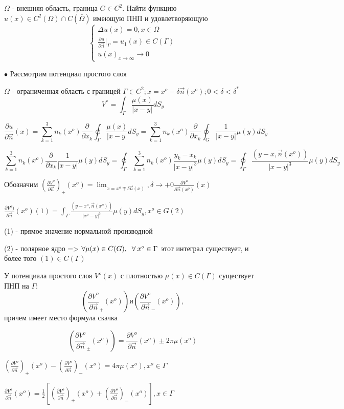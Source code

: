 \begin{theorem}
$\Omega$ - внешняя область, граница $G \in C^2$. Найти функцию $u(x) \in C^2(\Omega) \cap C(\bar{\Omega})$ имеющую ПНП и удовлетворяющую 
\begin{equation}
\begin{cases}
\Delta u(x) = 0, x \in \Omega
\\
\frac{\partial u}{\partial \vec{n}}|_{\Gamma} = u_1(x) \in C(\Gamma)
\\
u(x)_{x \to \infty} \to 0
\end{cases}
\end{equation}
\end{theorem}
$\bullet$ Рассмотрим потенциал простого слоя

$\Omega$ - ограниченная область с границей $\Gamma \in C^2; x = x^o - \delta \vec{n}(x^o); 0 < \delta < \delta^*$
  $$V^* = \int_{\Gamma} \frac{\mu(x)}{|x - y|}dS_y$$

$$\frac{\partial u}{\partial \vec{n}}(x) = \sum_{k = 1}^3 n_k(x^o) \frac{\partial}{\partial x_k}\oint_{\Gamma} \frac{\mu(x)}{|x - y|}dS_y = \sum_{k = 1}^3 n_k(x^o) \frac{\partial}{\partial x_k}\oint_G \frac{1}{|x - y|}\mu(y)dS_y$$

$$\sum_{k = 1}^3 n_k(x^o) \frac{\partial}{\partial x_k} \frac{1}{|x - y|}\mu(y)dS_y = \oint_{\Gamma} \sum_{k = 1}^3 n_k(x^o) \frac{y_k - x_k}{|x - y|^3}\mu(y)dS_y = \oint_{\Gamma} \frac{(y - x, \vec{n}(x^o))}{|x - y|^3}\mu(y)dS_y$$

Обозначим $\left( \frac{\partial V^o}{\partial \vec{n}} \right)_{\pm}(x^o) = \lim_{x = x^o \mp \delta \vec{n}(x)}, \delta \to +0 \frac{\partial V^o}{\partial \vec{n}(x^o)} (x)$

$\frac{\partial V^o)}{\partial \vec{n}}(x^o)(1) = \int_{\Gamma} \frac{(y - x^o, \vec{n}(x^o))}{|x^o - y|^3}\mu(y)dS_y, x^o \in G(2)$

(1) - прямое значение нормальной производной

(2) - полярное ядро => $\forall \mu(x) \in C(G), \;\;\forall\: x^o \in \Gamma$ этот интеграл существует, и более того $(1) \in C(\Gamma)$

\begin{theorem}
У потенциала простого слоя $V^o(x)$ с плотностью $\mu(x) \in C(\Gamma)$ существует ПНП на $\Gamma$: $$\left( \frac{\partial V^o}{\partial \vec{n}}_+(x^o)\right)
\text{и} \left(\frac{\partial V^o}{\partial \vec{n}}_-(x^o) \right),$$
причем имеет место формула скачка 

$$\left(\frac{\partial V^o}{\partial \vec{n}}_{\pm}(x^o) \right) = \frac{\partial V^o}{\partial \vec{n}}(x^o) \pm 2\pi \mu(x^o) $$
\end{theorem}
\begin{conseq}
$\left(\frac{\partial V^o}{\partial \vec{n}} \right)_+(x^o) - \left(\frac{\partial V^o}{\partial \vec{n}} \right)_-(x^o) = 4\pi \mu(x^o), x^o \in \Gamma$

$\frac{\partial V^o}{\partial \vec{n}}(x^o) = \frac{1}{2} \left[ \left(\frac{\partial V^o}{\partial \vec{n}} \right)_+(x^o) + \left(\frac{\partial V^o}{\partial \vec{n}} \right)_=(x^o)\right], x \in \Gamma$
\end{conseq}
